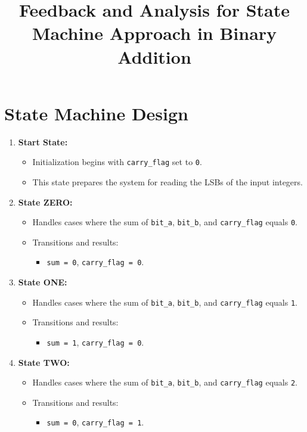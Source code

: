 \documentclass{article}
\title{Feedback and Analysis for State Machine Approach in Binary Addition}
\date{}
\begin{document}
\maketitle

\section*{State Machine Design}

\begin{enumerate}[label=\arabic*.]
    \item \textbf{Start State:}
    \begin{itemize}
        \item Initialization begins with \texttt{carry\_flag} set to \texttt{0}.
        \item This state prepares the system for reading the LSBs of the input integers.
    \end{itemize}

    \item \textbf{State ZERO:}
    \begin{itemize}
        \item Handles cases where the sum of \texttt{bit\_a}, \texttt{bit\_b}, and \texttt{carry\_flag} equals \texttt{0}.
        \item Transitions and results:
        \begin{itemize}
            \item \texttt{sum = 0}, \texttt{carry\_flag = 0}.
        \end{itemize}
    \end{itemize}

    \item \textbf{State ONE:}
    \begin{itemize}
        \item Handles cases where the sum of \texttt{bit\_a}, \texttt{bit\_b}, and \texttt{carry\_flag} equals \texttt{1}.
        \item Transitions and results:
        \begin{itemize}
            \item \texttt{sum = 1}, \texttt{carry\_flag = 0}.
        \end{itemize}
    \end{itemize}

    \item \textbf{State TWO:}
    \begin{itemize}
        \item Handles cases where the sum of \texttt{bit\_a}, \texttt{bit\_b}, and \texttt{carry\_flag} equals \texttt{2}.
        \item Transitions and results:
        \begin{itemize}
            \item \texttt{sum = 0}, \texttt{carry\_flag = 1}.
        \end{itemize}
    \end{itemize}


\end{enumerate}
\end{document}
